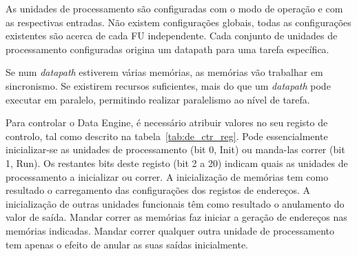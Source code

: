 As unidades de processamento são configuradas com o modo de operação e com as respectivas entradas. Não existem configurações globais, todas as configurações existentes são acerca de cada FU independente. Cada conjunto de unidades de processamento configuradas origina um datapath para uma tarefa específica.


Se num {\it datapath} estiverem várias memórias, as memórias vão trabalhar em sincronismo. Se existirem recursos suficientes, mais do que um {\it datapath} pode executar em paralelo, permitindo realizar paralelismo ao nível de tarefa. 

Para controlar o Data Engine, é necessário atribuir valores no seu registo de controlo, tal como descrito na tabela~\ref{tab:de_ctr_reg}. Pode essencialmente inicializar-se as unidades de processamento (bit 0, Init) ou manda-las correr (bit 1, Run). 
Os restantes bits deste registo (bit 2 a 20) indicam quais as unidades de processamento a inicializar ou correr. A inicialização de memórias tem como resultado o carregamento das configurações dos registos de endereços. A inicialização de outras unidades funcionais têm como resultado o anulamento do valor de saída.
Mandar correr as memórias faz iniciar a geração de endereços nas memórias indicadas. Mandar correr qualquer outra unidade de processamento tem apenas o efeito de anular as suas saídas inicialmente. 

